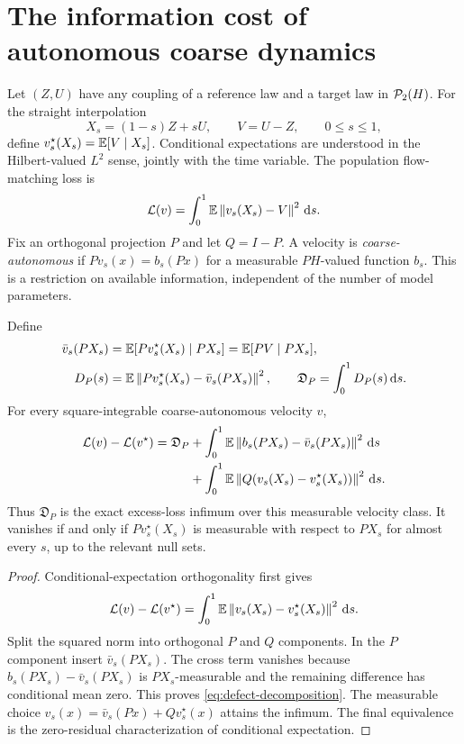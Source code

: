 \section{The information cost of autonomous coarse dynamics}\label{sec:obstruction}
Let $(Z,U)$ have any coupling of a reference law and a target law in $\mathcal P_2(H)$. For the straight interpolation
\begin{equation}\label{eq:global-bridge}
 X_s=(1-s)Z+sU,\qquad V=U-Z,\qquad 0\le s\le1,
\end{equation}
define $v_s^\star(X_s)=\mathbb E[V\mid X_s]$. Conditional expectations are understood in the Hilbert-valued $L^2$ sense, jointly with the time variable. The population flow-matching loss is
\begin{equation}\label{eq:global-loss}
 \mathcal L(v)=\int_0^1\mathbb E\left\lVert v_s(X_s)-V\right\rVert^2\,\mathrm d s.
\end{equation}
Fix an orthogonal projection $P$ and let $Q=I-P$. A velocity is \emph{coarse-autonomous} if $Pv_s(x)=b_s(Px)$ for a measurable $PH$-valued function $b_s$. This is a restriction on available information, independent of the number of model parameters.

\begin{theorem}\label{thm:defect}
Define
\begin{align}
 \bar v_s(PX_s)&=\mathbb E[Pv_s^\star(X_s)\mid PX_s]=\mathbb E[PV\mid PX_s],\\
 D_P(s)&=\mathbb E\left\lVert Pv_s^\star(X_s)-\bar v_s(PX_s)\right\rVert^2,
 \qquad \mathfrak D_P=\int_0^1D_P(s)\,\mathrm d s.
\end{align}
For every square-integrable coarse-autonomous velocity $v$,
\begin{align}\label{eq:defect-decomposition}
 \mathcal L(v)-\mathcal L(v^\star)
 =\mathfrak D_P
 &+\int_0^1\mathbb E\left\lVert b_s(PX_s)-\bar v_s(PX_s)\right\rVert^2\,\mathrm d s\notag\\
 &+\int_0^1\mathbb E\left\lVert Q(v_s(X_s)-v_s^\star(X_s))\right\rVert^2\,\mathrm d s.
\end{align}
Thus $\mathfrak D_P$ is the exact excess-loss infimum over this measurable velocity class. It vanishes if and only if $Pv_s^\star(X_s)$ is measurable with respect to $PX_s$ for almost every $s$, up to the relevant null sets.
\end{theorem}
\begin{proof}
Conditional-expectation orthogonality first gives
\[
 \mathcal L(v)-\mathcal L(v^\star)
 =\int_0^1\mathbb E\left\lVert v_s(X_s)-v_s^\star(X_s)\right\rVert^2\,\mathrm d s.
\]
Split the squared norm into orthogonal $P$ and $Q$ components. In the $P$ component insert $\bar v_s(PX_s)$. The cross term vanishes because $b_s(PX_s)-\bar v_s(PX_s)$ is $PX_s$-measurable and the remaining difference has conditional mean zero. This proves \eqref{eq:defect-decomposition}. The measurable choice $v_s(x)=\bar v_s(Px)+Qv_s^\star(x)$ attains the infimum. The final equivalence is the zero-residual characterization of conditional expectation.
\end{proof}

